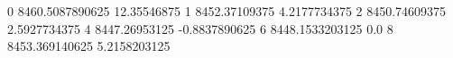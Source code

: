 0 8460.5087890625 12.35546875
1 8452.37109375 4.2177734375
2 8450.74609375 2.5927734375
4 8447.26953125 -0.8837890625
6 8448.1533203125 0.0
8 8453.369140625 5.2158203125

